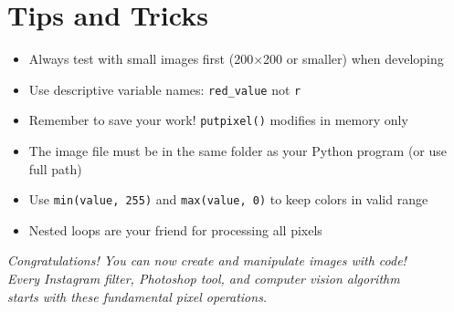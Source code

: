 \documentclass[11pt]{article}
\begin{document}
\section*{Tips and Tricks}

\begin{itemize}
    \item Always test with small images first (200×200 or smaller) when developing
    \item Use descriptive variable names: \texttt{red\_value} not \texttt{r}
    \item Remember to save your work! \texttt{putpixel()} modifies in memory only
    \item The image file must be in the same folder as your Python program (or use full path)
    \item Use \texttt{min(value, 255)} and \texttt{max(value, 0)} to keep colors in valid range
    \item Nested loops are your friend for processing all pixels
\end{itemize}

\vspace{2em}

\begin{center}
\textit{Congratulations! You can now create and manipulate images with code!\\
Every Instagram filter, Photoshop tool, and computer vision algorithm\\
starts with these fundamental pixel operations.}
\end{center}
\end{document}
